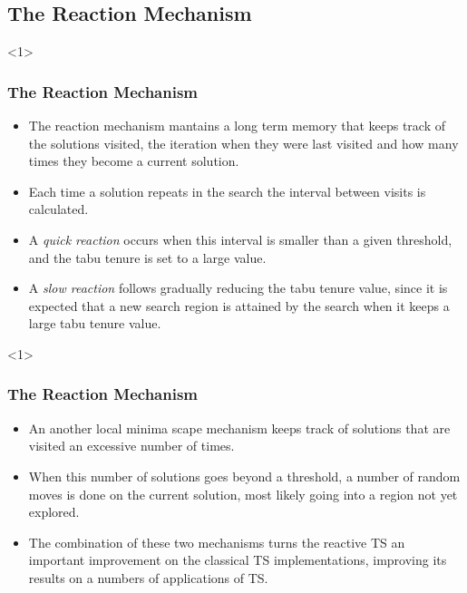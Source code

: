 \documentclass{beamer}
\begin{document}
\subsection{The Reaction Mechanism}

\begin{frame}<1>
  \frametitle{The Reaction Mechanism}

{ \footnotesize

  \begin{itemize}
  	\item The reaction mechanism mantains a long term memory that keeps track of the solutions visited, the iteration when they were last visited and how many times they become a current solution.
  	\item Each time a solution repeats in the search the interval between visits is calculated.
  	\item A {\em quick reaction} occurs when this interval is smaller than a given threshold, and the tabu tenure is set to a large value.
  	\item A {\em slow reaction} follows gradually reducing the tabu tenure value, since it is expected that a new search region is attained by the search when it keeps a large tabu tenure value.
  \end{itemize}

}
\end{frame}

\begin{frame}<1>
  \frametitle{The Reaction Mechanism}

{ 

  \begin{itemize}
  	\item An another local minima scape mechanism keeps track of solutions that are visited an excessive number of times.
  	
  	\item When this number of solutions goes beyond a threshold, a number of random moves is done on the current solution, most likely going into a region not yet explored.

  	\item The combination of these two mechanisms turns the reactive TS an important improvement on the classical TS implementations, improving its results on a numbers of applications of TS.

  \end{itemize}

}
\end{frame}
\end{document}
